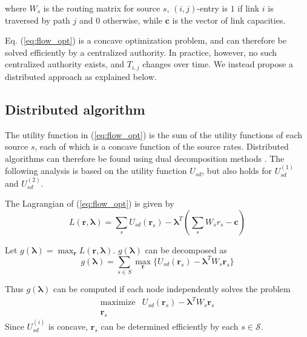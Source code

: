 \documentclass[conference]{IEEEtran}
\begin{document}
where $W_{s}$ is the routing matrix for source $s$, $(i,j)$-entry is $1$ if link $i$ is traversed by path $j$ and $0$ otherwise, while $\mathbf{c}$ is the vector of link capacities.

 Eq. (\ref{eq:flow_opt}) is a concave optimization problem, and can therefore be solved efficiently by a centralized authority.  In practice, however, no such centralized authority exists, and $T_{i,j}$ changes over time.  We instead propose a distributed approach as explained below.





\subsection{Distributed algorithm}
The utility function in (\ref{eq:flow_opt}) is the sum of the utility functions of each source $s$, each of which is a concave function of the source rates.  Distributed algorithms can therefore be found using dual decomposition methods \cite{chiang2007layering}.  The following analysis is based on the utility function $U_{sd}$, but also holds for $U_{sd}^{(1)}$ and $U_{sd}^{(2)}$.

The Lagrangian of (\ref{eq:flow_opt}) is given by
\begin{equation}
\label{eq:Lagrangian}
L(\mathbf{r}, \mathbf{\lambda}) = \sum_{s}{U_{sd}(\mathbf{r}_{s})} - \mathbf{\lambda}^{T}\left(\sum_{s}{W_{s}r_{s}} - \mathbf{c}\right)
\end{equation}

Let  $g(\mathbf{\lambda}) = \max_{\mathbf{r}}{L(\mathbf{r},\mathbf{\lambda})}$.  $g(\mathbf{\lambda})$ can be decomposed as
\begin{equation}
g(\mathbf{\lambda}) = \sum_{s \in S}{\max_{\mathbf{r}}{\{U_{sd}(\mathbf{r}_{s}) - \mathbf{\lambda}^{T}W_{s}\mathbf{r}_{s}\}}}
\end{equation}

Thus $g(\mathbf{\lambda})$ can be computed if each node independently solves the problem
\begin{equation}
\begin{array}{cc}
\mbox{maximize} & U_{sd}(\mathbf{r}_{s}) - \mathbf{\lambda}^{T}W_{s}\mathbf{r}_{s} \\
\mathbf{r}_{s} &
\end{array}
\end{equation}
Since $U_{sd}^{(i)}$ is concave, $\mathbf{r}_{s}$ can be determined efficiently by each $s \in \mathcal{S}$.
\end{document}
